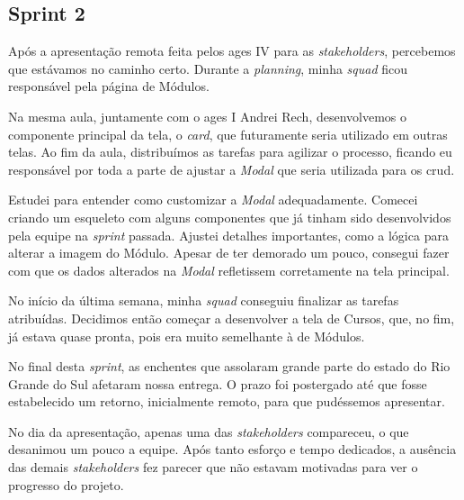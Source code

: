 \subsection{Sprint 2}

Após a apresentação remota feita pelos \ac{ages} IV para as \textit{stakeholders}, percebemos que estávamos no caminho certo. Durante a \textit{planning}, minha \textit{squad} ficou responsável pela página de Módulos.

Na mesma aula, juntamente com o \ac{ages} I Andrei Rech, desenvolvemos o componente principal da tela, o \textit{card}, que futuramente seria utilizado em outras telas. Ao fim da aula, distribuímos as tarefas para agilizar o processo, ficando eu responsável por toda a parte de ajustar a \textit{Modal} que seria utilizada para os \ac{crud}.

Estudei para entender como customizar a \textit{Modal} adequadamente. Comecei criando um esqueleto com alguns componentes que já tinham sido desenvolvidos pela equipe na \textit{sprint} passada. Ajustei detalhes importantes, como a lógica para alterar a imagem do Módulo. Apesar de ter demorado um pouco, consegui fazer com que os dados alterados na \textit{Modal} refletissem corretamente na tela principal.

No início da última semana, minha \textit{squad} conseguiu finalizar as tarefas atribuídas. Decidimos então começar a desenvolver a tela de Cursos, que, no fim, já estava quase pronta, pois era muito semelhante à de Módulos.

No final desta \textit{sprint}, as enchentes que assolaram grande parte do estado do Rio Grande do Sul afetaram nossa entrega. O prazo foi postergado até que fosse estabelecido um retorno, inicialmente remoto, para que pudéssemos apresentar.

No dia da apresentação, apenas uma das \textit{stakeholders} compareceu, o que desanimou um pouco a equipe. Após tanto esforço e tempo dedicados, a ausência das demais \textit{stakeholders} fez parecer que não estavam motivadas para ver o progresso do projeto.